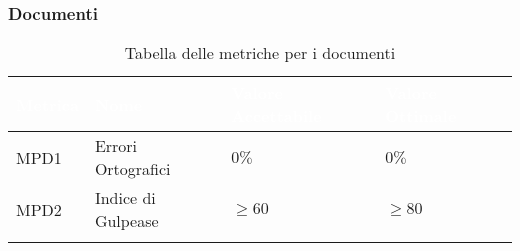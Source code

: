 \subsubsection{Documenti}
\begin{center}
  \renewcommand{\arraystretch}{1.25}
  \begin{longtable}{|p{1.8cm}|p{3.5cm}|p{3.8cm}|p{3.3cm}|} \hline
    \rowcolor[HTML]{036400}
    \textcolor{white}{\textbf{Metrica}} & \textcolor{white}{\textbf{Nome}} & \textcolor{white}{\textbf{Valore Accettabile}} & \textcolor{white}{\textbf{Valore Ottimale}}    \\ \hline
      \rowcolor[HTML]{EFEFEF}
      MPD1 & Errori Ortografici    & $0\%$      & $0\%$        \\ \hline
      \rowcolor[HTML]{C0C0C0}
      MPD2 & Indice di Gulpease    & $\geq60$   & $\geq80$     \\ \hline
      \caption{Tabella delle metriche per i documenti}
  \end{longtable}
\end{center}

\vspace{-2cm}
